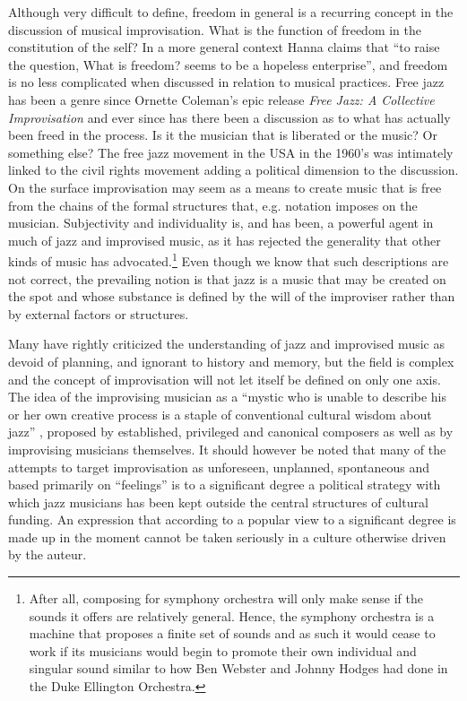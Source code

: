 \documentclass[a4paper]{article}
\begin{document}
Although very difficult to define, freedom in general is a recurring concept in the discussion of musical improvisation. What is the function of freedom in the constitution of the self? In a more general context Hanna \citet{arendt77} claims that ``to raise the question, What is freedom? seems to be a hopeless enterprise'', and freedom is no less complicated when discussed in relation to musical practices. Free jazz has been a genre since Ornette Coleman's epic release \emph{Free Jazz: A Collective Improvisation} \citep{coleman60} and ever since has there been a discussion as to what has actually been freed in the process. Is it the musician that is liberated or the music? Or something else? The free jazz movement in the USA in the 1960's was intimately linked to the civil rights movement adding a political dimension to the discussion. On the surface improvisation may seem as a means to create music that is free from the chains of the formal structures that, e.g. notation imposes on the musician. Subjectivity and individuality is, and has been, a powerful agent in much of jazz and improvised music, as it has rejected the generality that other kinds of music has advocated.\footnote{After all, composing for symphony orchestra will only make sense if the sounds it offers are relatively general. Hence, the symphony orchestra is a machine that proposes a finite set of sounds and as such it would cease to work if its musicians would begin to promote their own individual and singular sound similar to how Ben Webster and Johnny Hodges had done in the Duke Ellington Orchestra.} Even though we know that such descriptions are not correct, the prevailing notion is that jazz is a music that may be created on the spot and whose substance is defined by the will of the improviser rather than by external factors or structures. 

Many have rightly criticized the understanding of jazz and improvised music as devoid of planning, and ignorant to history and memory, but the field is complex and the concept of improvisation will not let itself be defined on only one axis. The idea of the improvising musician as a ``mystic who is unable to describe his or her own creative process is a staple of conventional cultural wisdom about jazz'' \citep[p. 170]{lewis-1}, proposed by established, privileged and canonical composers as well as by improvising musicians themselves. It should however be noted that many of the attempts to target improvisation as unforeseen, unplanned, spontaneous and based primarily on ``feelings'' is to a significant degree a political strategy with which jazz musicians has been kept outside the central structures of cultural funding. An expression that according to a popular view to a significant degree is made up in the moment cannot be taken seriously in a culture otherwise driven by the auteur. 
\end{document}
